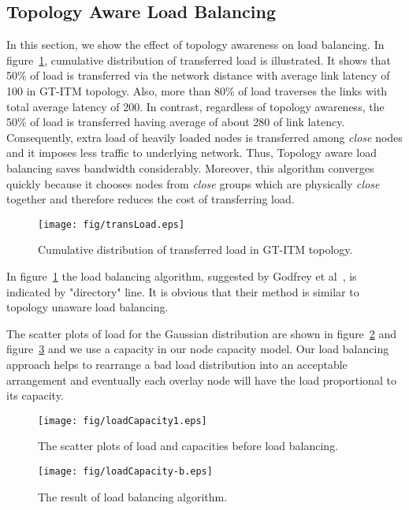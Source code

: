 \documentclass {article}
\begin{document}
\subsection{Topology Aware Load Balancing}
In this section, we show the  effect of topology awareness on load balancing. In figure~\ref{LoadBalancing}, cumulative distribution of transferred load is illustrated. It shows that 50\%  of load  is transferred
via the network distance with average link  latency of 100 in GT-ITM topology. Also, more than
80\% of load traverses the links with total average latency of 200. In contrast,
regardless of topology awareness, the 50\% of load is transferred having average of about 280 of link latency. Consequently, extra load of heavily loaded nodes is transferred among \emph{close} nodes and it imposes less
traffic to underlying network. Thus, Topology aware load balancing saves bandwidth considerably.
Moreover, this algorithm converges quickly because it chooses nodes from  \emph{close} groups which are physically  \emph{close} together and therefore reduces the cost of transferring load.
\begin{figure}[h]
\texttt{[image: fig/transLoad.eps]}
\caption{Cumulative distribution of transferred load  in GT-ITM topology.}
\label{LoadBalancing}
\end{figure}
In figure~\ref{LoadBalancing} the load balancing algorithm, suggested by Godfrey et al~\cite{loadbalancedsp}, is indicated
by "directory" line. It is obvious that their method is similar to topology unaware load balancing.

The scatter plots of load for the Gaussian
distribution are shown  in figure~\ref{fig:capacity1} and figure~\ref{fig:capacity2}
 and we use a  capacity in our  node capacity model. Our load balancing approach helps to  rearrange a bad load distribution into an acceptable arrangement and eventually each overlay node will have the load proportional to its capacity.
\begin{figure}[h]
\texttt{[image: fig/loadCapacity1.eps]}
\caption{The scatter plots of load and capacities before load balancing. }
\label{fig:capacity1}
\end{figure}
\begin{figure}[ht]
\texttt{[image: fig/loadCapacity-b.eps]}
\caption{The result of load balancing algorithm. }
\label{fig:capacity2}
\end{figure}
\end{document}
